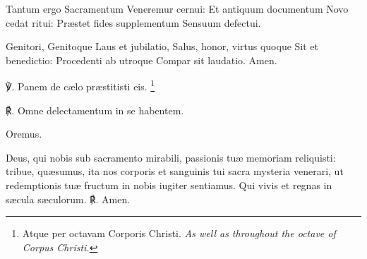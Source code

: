 Tantum ergo Sacramentum
Veneremur cernui:
Et antiquum documentum
Novo cedat ritui:
Præstet fides supplementum
Sensuum defectui.

Genitori, Genitoque
Laus et jubilatio,
Salus, honor, virtus quoque
Sit et benedictio:
Procedenti ab utroque
Compar sit laudatio. Amen.

℣. Panem de cælo præstitisti eis. \tpalleluia{}\footnote{Atque per octavam Corporis Christi. \textit{As well as throughout the octave of Corpus Christi.}}

℟. Omne delectamentum in se habentem. \tpalleluia{}
\par
Oremus.

Deus, qui nobis sub sacramento mirabili, passionis tuæ memoriam reliquisti: tribue, quæsumus, ita nos corporis et sanguinis tui sacra mysteria venerari, ut redemptionis tuæ fructum in nobis iugiter sentiamus. Qui vivis et regnas in sæcula sæculorum. ℟. Amen. 